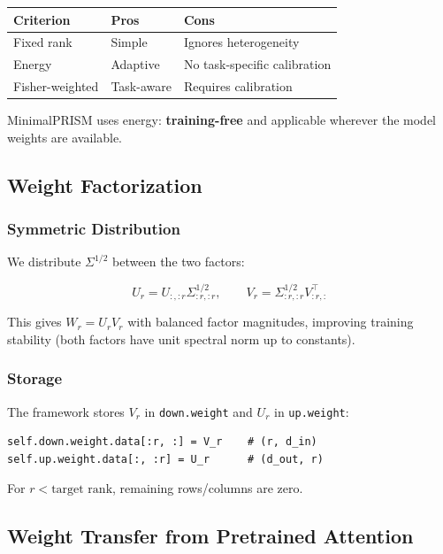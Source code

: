 \begin{table}[H]
\centering
\small
\begin{tabular}{lll}
\toprule
\textbf{Criterion} & \textbf{Pros} & \textbf{Cons} \\
\midrule
Fixed rank & Simple & Ignores heterogeneity \\
Energy & Adaptive & No task-specific calibration \\
Fisher-weighted & Task-aware & Requires calibration \\
\bottomrule
\end{tabular}
\end{table}

MinimalPRISM uses energy: \textbf{training-free} and applicable wherever the 
model weights are available.

\subsection{Weight Factorization}

\subsubsection{Symmetric Distribution}

We distribute $\Sigma^{1/2}$ between the two factors:

\[
U_r = U_{:, :r} \Sigma_{:r, :r}^{1/2}, \qquad
V_r = \Sigma_{:r, :r}^{1/2} V_{:r, :}^\top
\tag{4.6}
\]

This gives $W_r = U_r V_r$ with balanced factor magnitudes, improving 
training stability (both factors have unit spectral norm up to constants).

\subsubsection{Storage}

The framework stores $V_r$ in \texttt{down.weight} and $U_r$ in \texttt{up.weight}:

\begin{lstlisting}
self.down.weight.data[:r, :] = V_r    # (r, d_in)
self.up.weight.data[:, :r] = U_r      # (d_out, r)
\end{lstlisting}

For $r < \text{target rank}$, remaining rows/columns are zero.

\subsection{Weight Transfer from Pretrained Attention}


